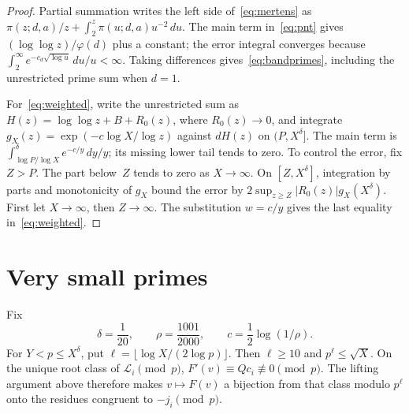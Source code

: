 \documentclass[11pt,a4paper]{article}
\newcommand{\LL}{\mathcal L}
\newcommand{\1}{\mathbf 1}
\numberwithin{equation}{section}
\begin{document}
\begin{proof}
Partial summation writes the left side of~\eqref{eq:mertens} as
\(\pi(z;d,a)/z+\int_2^z\pi(u;d,a)u^{-2}\,du\). The main term
in~\eqref{eq:pnt} gives \((\log\log z)/\varphi(d)\) plus a constant;
the error integral converges because
\(\int_2^\infty e^{-c_d\sqrt{\log u}}\,du/u<\infty\).
Taking differences gives~\eqref{eq:bandprimes}, including the unrestricted
prime sum when \(d=1\).

For~\eqref{eq:weighted}, write the unrestricted sum as
\(H(z)=\log\log z+B+R_0(z)\), where \(R_0(z)\to0\), and integrate
\(g_X(z)=\exp(-c\log X/\log z)\) against \(dH(z)\) on \((P,X^\delta]\).
The main term is
\(\int_{\log P/\log X}^{\delta}e^{-c/y}\,dy/y\); its missing lower tail
tends to zero. To control the error, fix \(Z>P\). The part below~\(Z\)
tends to zero as \(X\to\infty\). On \([Z,X^\delta]\), integration by
parts and monotonicity of \(g_X\) bound the error by
\(2\sup_{z\geq Z}|R_0(z)|g_X(X^\delta)\).
First let \(X\to\infty\), then \(Z\to\infty\). The substitution \(w=c/y\)
gives the last equality in~\eqref{eq:weighted}.
\end{proof}

\section{Very small primes}\label{sec:small}

Fix
\[
 \delta=\frac1{20},\qquad \rho=\frac{1001}{2000},\qquad
 c=\frac12\log(1/\rho).
\]
For \(Y<p\leq X^\delta\), put
\(\ell=\lfloor\log X/(2\log p)\rfloor\). Then \(\ell\geq10\) and
\(p^\ell\leq\sqrt X\). On the unique root class of \(\LL_i\pmod p\),
\(F'(v)\equiv Qc_i\not\equiv0\pmod p\). The lifting argument above
therefore makes \(v\mapsto F(v)\) a bijection from that class modulo
\(p^\ell\) onto the residues congruent to \(-j_i\pmod p\).
\end{document}
